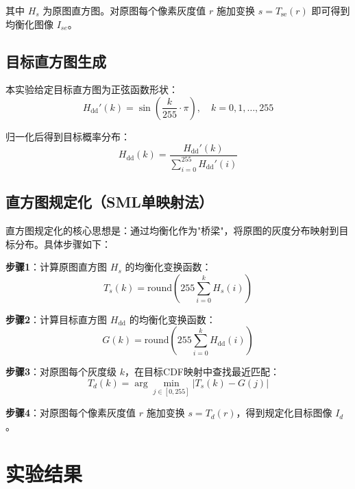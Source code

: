 \documentclass[a4paper,zihao=5]{ctexart}
\begin{document}
其中 $H_s$ 为原图直方图。对原图每个像素灰度值 $r$ 施加变换 $s = T_{\mathrm{se}}(r)$ 即可得到均衡化图像 $I_{se}$。

\subsection{目标直方图生成}

本实验给定目标直方图为正弦函数形状：
\begin{equation}
  H_{\mathrm{dd}}'(k) = \sin\!\left(\frac{k}{255}\cdot\pi\right), \quad k = 0, 1, \ldots, 255
\end{equation}

归一化后得到目标概率分布：
\begin{equation}
  H_{\mathrm{dd}}(k) = \frac{H_{\mathrm{dd}}'(k)}{\displaystyle\sum_{i=0}^{255} H_{\mathrm{dd}}'(i)}
\end{equation}

\subsection{直方图规定化（SML单映射法）}

直方图规定化的核心思想是：通过均衡化作为"桥梁"，将原图的灰度分布映射到目标分布。具体步骤如下：

\textbf{步骤1}：计算原图直方图 $H_s$ 的均衡化变换函数：
\begin{equation}
  T_s(k) = \mathrm{round}\!\left( 255 \sum_{i=0}^{k} H_s(i) \right)
\end{equation}

\textbf{步骤2}：计算目标直方图 $H_{\mathrm{dd}}$ 的均衡化变换函数：
\begin{equation}
  G(k) = \mathrm{round}\!\left( 255 \sum_{i=0}^{k} H_{\mathrm{dd}}(i) \right)
\end{equation}

\textbf{步骤3}：对原图每个灰度级 $k$，在目标CDF映射中查找最近匹配：
\begin{equation}
  T_d(k) = \arg\min_{j \in [0,255]} \left| T_s(k) - G(j) \right|
\end{equation}

\textbf{步骤4}：对原图每个像素灰度值 $r$ 施加变换 $s = T_d(r)$，得到规定化目标图像 $I_d$。

\section{实验结果}
\end{document}
